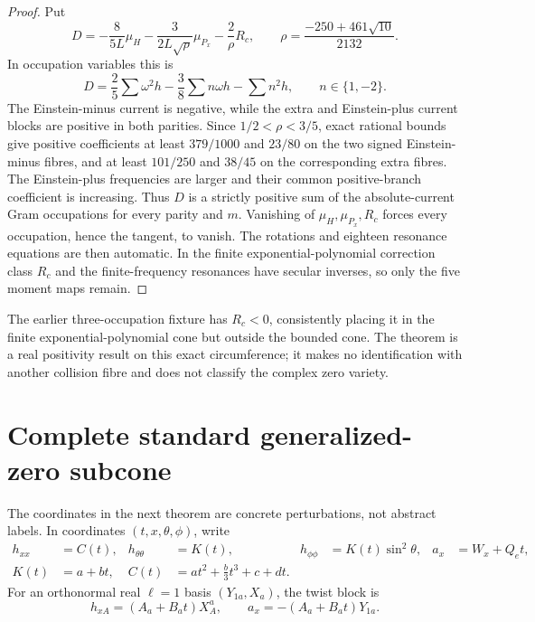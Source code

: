 \documentclass[11pt]{article}
\theoremstyle{definition}
\theoremstyle{remark}
\begin{document}
\begin{proof}
Put
\[
 D=-\frac{8}{5L}\mu_H
   -\frac{3}{2L\sqrt\rho}\mu_{P_x}
   -\frac{2}{\rho}R_c,
 \qquad
 \rho=\frac{-250+461\sqrt{10}}{2132}.
\]
In occupation variables this is
\[
 D=\frac25\sum\omega^2h-\frac38\sum n\omega h-
   \sum n^2h,
 \qquad n\in\{1,-2\}.
\]
The Einstein-minus current is negative, while the extra and Einstein-plus
current blocks are positive in both parities.  Since
\(1/2<\rho<3/5\), exact rational bounds give positive coefficients at least
\(379/1000\) and \(23/80\) on the two signed Einstein-minus fibres, and at
least \(101/250\) and \(38/45\) on the corresponding extra fibres.  The
Einstein-plus frequencies are larger and their common positive-branch
coefficient is increasing.  Thus \(D\) is a strictly positive sum of the
absolute-current Gram occupations for every parity and \(m\).  Vanishing of
\(\mu_H,\mu_{P_x},R_c\) forces every occupation, hence the tangent, to vanish.
The rotations and eighteen resonance equations are then automatic.  In the
finite exponential-polynomial correction class \(R_c\) and the
finite-frequency resonances have
secular inverses, so only the five moment maps remain.
\end{proof}

The earlier three-occupation fixture has \(R_c<0\), consistently placing it
in the finite exponential-polynomial cone but outside the bounded cone.  The theorem is a real
positivity result on this exact circumference; it makes no identification
with another collision fibre and does not classify the complex zero variety.

\section{Complete standard generalized-zero subcone}

The coordinates in the next theorem are concrete perturbations, not abstract
labels.  In coordinates \((t,x,\theta,\phi)\), write
\begin{align}
 h_{xx}&=C(t),
 &h_{\theta\theta}&=K(t),
 &h_{\phi\phi}&=K(t)\sin^2\theta,
 &a_x&=W_x+Q_et,\\
 K(t)&=a+bt,
 &C(t)&=at^2+\frac b3t^3+c+dt.
\end{align}
For an orthonormal real \(\ell=1\) basis \((Y_{1a},X_a)\), the twist block is
\begin{equation}
 h_{xA}=(A_a+B_at)X^a_A,
 \qquad
 a_x=-(A_a+B_at)Y_{1a}.
\end{equation}
\end{document}
